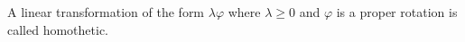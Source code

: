 A linear transformation of the form $\lambda \varphi$ where $\lambda \geq 0$ and $\varphi$ is a proper rotation is called homothetic.
